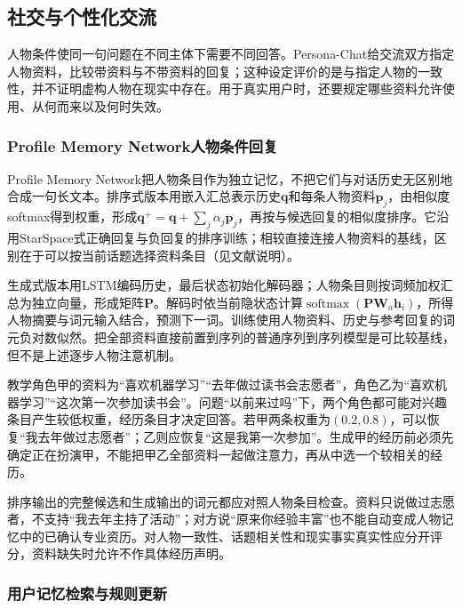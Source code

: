 \subsection{社交与个性化交流}
\label{sec:nlp-dialogue-personalization}

人物条件使同一句问题在不同主体下需要不同回答。Persona-Chat给交流双方指定人物资料，比较带资料与不带资料的回复；这种设定评价的是与指定人物的一致性，并不证明虚构人物在现实中存在。用于真实用户时，还要规定哪些资料允许使用、从何而来以及何时失效。

\subsubsection{Profile Memory Network人物条件回复}
\label{sec:nlp-dialogue-profile-memory}

Profile Memory Network把人物条目作为独立记忆，不把它们与对话历史无区别地合成一句长文本。排序式版本用嵌入汇总表示历史$\bm{q}$和每条人物资料$\bm{p}_j$，由相似度softmax得到权重，形成$\bm{q}^{+}=\bm{q}+\sum_j\alpha_j\bm{p}_j$，再按与候选回复的相似度排序。它沿用StarSpace式正确回复与负回复的排序训练；相较直接连接人物资料的基线，区别在于可以按当前话题选择资料条目（见文献说明）。

生成式版本用LSTM编码历史，最后状态初始化解码器；人物条目则按词频加权汇总为独立向量，形成矩阵$\bm{P}$。解码时依当前隐状态计算$\operatorname{softmax}(\bm{P}\bm{W}_a\bm{h}_i)$，所得人物摘要与词元输入结合，预测下一词。训练使用人物资料、历史与参考回复的词元负对数似然。把全部资料直接前置到序列的普通序列到序列模型是可比较基线，但不是上述逐步人物注意机制。

教学角色甲的资料为“喜欢机器学习”“去年做过读书会志愿者”，角色乙为“喜欢机器学习”“这次第一次参加读书会”。问题“以前来过吗”下，两个角色都可能对兴趣条目产生较低权重，经历条目才决定回答。若甲两条权重为$(0.2,0.8)$，可以恢复“我去年做过志愿者”；乙则应恢复“这是我第一次参加”。生成甲的经历前必须先确定正在扮演甲，不能把甲乙全部资料一起做注意力，再从中选一个较相关的经历。

排序输出的完整候选和生成输出的词元都应对照人物条目检查。资料只说做过志愿者，不支持“我去年主持了活动”；对方说“原来你经验丰富”也不能自动变成人物记忆中的已确认专业资历。对人物一致性、话题相关性和现实事实真实性应分开评分，资料缺失时允许不作具体经历声明。

\subsubsection{用户记忆检索与规则更新}
\label{sec:nlp-dialogue-user-memory}

